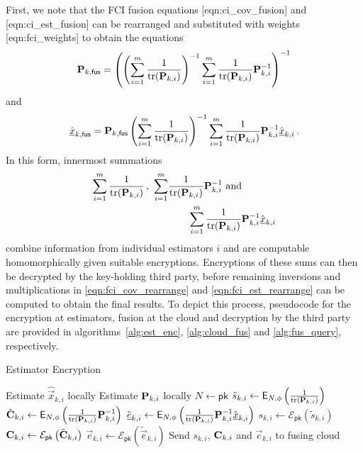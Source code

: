 First, we note that the FCI fusion equations [eqn:ci\_cov\_fusion] and [eqn:ci\_est\_fusion] can be rearranged and substituted with weights [eqn:fci\_weights] to obtain the equations
\begin{equation}\label{eqn:fci_cov_rearrange}
    {\ensuremath{{\mathbf{P}}}}_{k,\mathsf{fus}} = \left(\left(\sum_{i=1}^m \frac{1}{\operatorname{tr}({{\mathbf{P}}}_{k,i})}\right)^{-1}\sum_{i=1}^m \frac{1}{\operatorname{tr}({{\mathbf{P}}}_{k,i})}{{\mathbf{P}}}_{k,i}^{-1}\right)^{-1}
\end{equation}
and
\begin{equation}\label{eqn:fci_est_rearrange}
    \hat{{\underline{x}}}_{k,\mathsf{fus}} = {{\mathbf{P}}}_{k,\mathsf{fus}}\left(\sum_{i=1}^m \frac{1}{\operatorname{tr}({{\mathbf{P}}}_{k,i})}\right)^{-1}\sum_{i=1}^m\frac{1}{\operatorname{tr}({{\mathbf{P}}}_{k,i})}{{\mathbf{P}}}_{k,i}^{-1}\hat{{\underline{x}}}_{k,i}\,.
\end{equation}
In this form, innermost summations  
\begin{equation}
    \begin{split}
        \sum_{i=1}^m \frac{1}{\operatorname{tr}({{\mathbf{P}}}_{k,i})}\,,\ \sum_{i=1}^m &\frac{1}{\operatorname{tr}({{\mathbf{P}}}_{k,i})}{{\mathbf{P}}}_{k,i}^{-1}\text{ and }\\ 
        &\qquad\sum_{i=1}^m\frac{1}{\operatorname{tr}({{\mathbf{P}}}_{k,i})}{{\mathbf{P}}}_{k,i}^{-1}\hat{{\underline{x}}}_{k,i}
    \end{split}
\end{equation}
combine information from individual estimators $i$ and are computable homomorphically given suitable encryptions. Encryptions of these sums can then be decrypted by the key-holding third party, before remaining inversions and multiplications in \eqref{eqn:fci_cov_rearrange} and \eqref{eqn:fci_est_rearrange} can be computed to obtain the final results. To depict this process, pseudocode for the encryption at estimators, fusion at the cloud and decryption by the third party are provided in algorithms~\ref{alg:est_enc}, \ref{alg:cloud_fus} and \ref{alg:fus_query}, respectively.
\begin{algorithm}[htbp]
\caption{Estimator Encryption}\label{alg:est_enc}
\begin{algorithmic}[1]
    \State Estimate $\hat{\vec{x}}_{k,i}$ locally
    \State Estimate ${{\mathbf{P}}}_{k,i}$ locally
    \State $N \gets \mathsf{pk}$
    \State $\tilde{s}_{k,i} \gets \mathsf{E}_{N,\phi}\left(\frac{1}{\operatorname{tr}({{\mathbf{P}}}_{k,i})}\right)$
    \State $\tilde{{{\mathbf{C}}}}_{k,i} \gets \mathsf{E}_{N,\phi}\left(\frac{1}{\operatorname{tr}({{\mathbf{P}}}_{k,i})}{{\mathbf{P}}}_{k,i}^{-1}\right)$
    \State $\tilde{{\underline{e}}}_{k,i} \gets \mathsf{E}_{N,\phi}\left(\frac{1}{\operatorname{tr}({{\mathbf{P}}}_{k,i})}{{\mathbf{P}}}_{k,i}^{-1}\hat{{\underline{x}}}_{k,i}\right)$
    \State $s_{k,i} \gets \mathcal{E}_{\mathsf{pk}}\left(\tilde{s}_{k,i}\right)$
    \State ${{\mathbf{C}}}_{k,i} \gets \mathcal{E}_{\mathsf{pk}}\left(\tilde{{{\mathbf{C}}}}_{k,i}\right)$
    \State $\vec{e}_{k,i} \gets \mathcal{E}_{\mathsf{pk}}\left(\tilde{\vec{e}}_{k,i}\right)$
    \State Send $s_{k,i}$, ${{\mathbf{C}}}_{k,i}$ and $\vec{e}_{k,i}$ to fusing cloud
    \EndProcedure
\end{algorithmic}
\end{algorithm}
